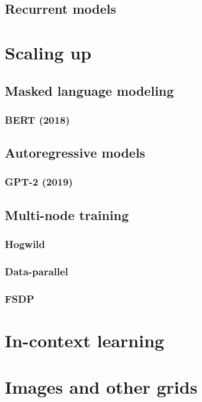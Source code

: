 \documentclass{pca}
\theoremstyle{theorem}
\theoremstyle{definition}
\theoremstyle{proof}
\begin{document}
\section{Recurrent models}

\chapter{Scaling up}


\section{Masked language modeling}

\subsection{BERT (2018)}

\section{Autoregressive models}

\subsection{GPT-2 (2019)}

\section{Multi-node training}

\subsection{Hogwild}

\subsection{Data-parallel}

\subsection{FSDP}

\chapter{In-context learning}

\chapter{Images and other grids}
\end{document}
